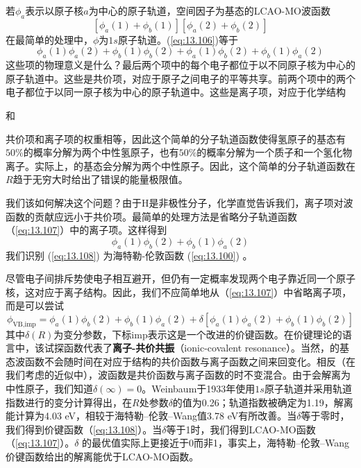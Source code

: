     若$\phi_a$表示以原子核$a$为中心的原子轨道，空间因子为基态的LCAO-MO波函数
    \begin{equation}
        \left[\phi_a\left(1\right)+\phi_b\left(1\right)\right]\left[\phi_a\left(2\right)+\phi_b\left(2\right)\right]
        \label{eq:13.106}
    \end{equation}
    在最简单的处理中，$\phi$为$1s$原子轨道。(\ref{eq:13.106})等于
    \begin{equation}
        \phi_a\left(1\right)\phi_a\left(2\right) + \phi_b\left(1\right)\phi_b\left(2\right) + \phi_a\left(1\right)\phi_b\left(2\right) + \phi_b\left(1\right)\phi_a\left(2\right)
        \label{eq:13.107}
    \end{equation}
    这些项的物理意义是什么？最后两个项中的每个电子都位于以不同原子核为中心的原子轨道中。这些是共价项，对应于原子之间电子的平等共享。前两个项中的两个电子都位于以同一原子核为中心的原子轨道中。这些是离子项，对应于化学结构
    \begin{center}
         和 
    \end{center}
    共价项和离子项的权重相等，因此这个简单的分子轨道函数使得氢原子的基态有$50\%$的概率分解为两个中性氢原子，也有$50\%$的概率分解为一个质子和一个氢化物离子。实际上，的基态会分解为两个中性原子。因此，这个简单的分子轨道函数在$R$趋于无穷大时给出了错误的能量极限值。

    我们该如何解决这个问题？由于H是非极性分子，化学直觉告诉我们，离子项对波函数的贡献应远小于共价项。最简单的处理方法是省略分子轨道函数（\ref{eq:13.107}）中的离子项。这样得到
    \begin{equation}
        \phi_a\left(1\right)\phi_b\left(2\right) + \phi_b\left(1\right)\phi_a\left(2\right)
        \label{eq:13.108}
    \end{equation}
    我们识别 (\ref{eq:13.108}) 为海特勒-伦敦函数 (\ref{eq:13.100}) 。

    尽管电子间排斥势使电子相互避开，但仍有一定概率发现两个电子靠近同一个原子核，这对应于离子结构。因此，我们不应简单地从（\ref{eq:13.107}）中省略离子项，而是可以尝试
    \begin{equation}
        \phi_{\text{VB,imp}} = \phi_a\left(1\right)\phi_b\left(2\right) + \phi_b\left(1\right)\phi_a\left(2\right) + \delta\left[\phi_a\left(1\right)\phi_a\left(2\right) + \phi_b\left(1\right)\phi_b\left(2\right)\right]
        \label{eq:13.109}
    \end{equation}
    其中$\delta\left(R\right)$为变分参数，下标imp表示这是一个改进的价键函数。在价键理论的语言中，该试探函数代表了\textbf{离子-共价共振}（ionic-covalent resonance）。当然，的基态波函数不会随时间在对应于结构的共价函数与离子函数之间来回变化。相反（在我们考虑的近似中），波函数是共价函数与离子函数的时不变混合。由于会解离为中性原子，我们知道$\delta\left(\infty\right)=0$。Weinbaum于1933年使用$1s$原子轨道并采用轨道指数进行的变分计算得出，在$R$处参数$\delta$的值为0.26；轨道指数被确定为1.19，解离能计算为4.03 eV，相较于海特勒–伦敦–Wang值3.78 eV有所改善。当$\delta$等于零时，我们得到价键函数（\ref{eq:13.108}）。当$\delta$等于1时，我们得到LCAO-MO函数（\ref{eq:13.107}）。$\delta$ 的最优值实际上更接近于0而非1，事实上，海特勒–伦敦–Wang 价键函数给出的解离能优于LCAO-MO函数。

